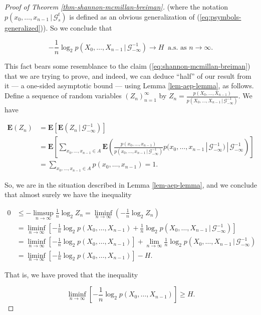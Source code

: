 \begin{proof}[Proof of Theorem \ref{thm-shannon-mcmillan-breiman}]
\noindent (where the notation
$p(x_0,\ldots,x_{n-1}\,|\,\mathcal{G}_s^t)$ is
defined as an obvious generalization of
(\ref{eq:psymbols-generalized})). So we conclude that

\[
-\frac{1}{n} \log_2 p(X_0,\ldots,X_{n-1}\,|\,\mathcal{G}_{-\infty}^{-1})
\to H \ \textrm{ a.s. as }n\to\infty.
\]

\noindent This fact bears some resemblance to the claim
(\ref{eq:shannon-mcmillan-breiman}) that we are trying to
prove, and indeed, we can deduce ``half'' of our
result from it --- a one-sided asymptotic bound ---
using Lemma \ref{lem-aep-lemma}, as follows. Define a
sequence of random variables $(Z_n)_{n=1}^\infty$ by
$Z_n =
\frac{p(X_0,\ldots,X_{n-1})}{p(X_0,\ldots,X_{n-1}\,|\,\mathcal{G}_{-\infty}^{-1})}$.
We have

\begin{align*}
\mathbf{E}(Z_n) &= \mathbf{E} \left[\mathbf{E}\left(Z_n\,|\,\mathcal{G}_{-\infty}^{-1}\right)\right] \\
&= \mathbf{E}\left[
\sum_{x_0,\ldots,x_{n-1}\in A}
\mathbf{E}\left(
\frac{p(x_0,\ldots,x_{n-1})}{p(x_0,\ldots,x_{n-1}\,|\,\mathcal{G}_{-\infty}^{-1})}
p(x_0,\ldots,x_{n-1}\,|\,\mathcal{G}_{-\infty}^{-1})
\,|\,\mathcal{G}_{-\infty}^{-1}\right)
\right] \\
&= \tag{39}\label{eq:aep-expec1} \sum_{x_0,\ldots,x_{n-1}\in A} p(x_0,\ldots,x_{n-1}) = 1.
\end{align*}

\noindent So, we are in the situation described in Lemma
\ref{lem-aep-lemma}, and we conclude that almost surely we
have the inequality

\begin{align*}
0 &\le -\limsup_{n\to\infty} \frac{1}{n} \log_2 Z_n = \liminf_{n\to\infty} \left(-\frac{1}{n} \log_2 Z_n\right) \\
&= \liminf_{n\to\infty} \left[
-\frac{1}{n} \log_2 p(X_0,\ldots,X_{n-1}) + \frac{1}{n}\log_2 p(X_0,\ldots,X_{n-1}\,|\,\mathcal{G}_{-\infty}^{-1}) \right] \\
&=
\liminf_{n\to\infty} \left[-\frac{1}{n} \log_2 p(X_0,\ldots,X_{n-1})\right] +
\lim_{n\to\infty}
\frac{1}{n}\log_2 p(X_0,\ldots,X_{n-1}\,|\,\mathcal{G}_{-\infty}^{-1}) \\
&=
\liminf_{n\to\infty} \left[-\frac{1}{n} \log_2 p(X_0,\ldots,X_{n-1})\right] - H.
\end{align*}

\noindent That is, we have proved that the inequality

\begin{equation*} \tag{40}\label{eq:smb-first-half}
\liminf_{n\to\infty} \left[-\frac{1}{n} \log_2 p(X_0,\ldots,X_{n-1})\right] \ge H.
\end{equation*}


\end{proof}
